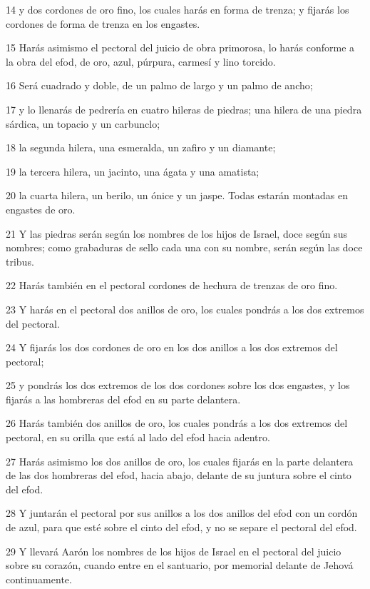 \par 14 y dos cordones de oro fino, los cuales harás en forma de trenza; y fijarás los cordones de forma de trenza en los engastes.
\par 15 Harás asimismo el pectoral del juicio de obra primorosa, lo harás conforme a la obra del efod, de oro, azul, púrpura, carmesí y lino torcido.
\par 16 Será cuadrado y doble, de un palmo   de largo y un palmo de ancho;
\par 17 y lo llenarás de pedrería en cuatro hileras de piedras; una hilera de una piedra sárdica, un topacio y un carbunclo;
\par 18 la segunda hilera, una esmeralda, un zafiro y un diamante;
\par 19 la tercera hilera, un jacinto, una ágata y una amatista;
\par 20 la cuarta hilera, un berilo, un ónice y un jaspe. Todas estarán montadas en engastes de oro.
\par 21 Y las piedras serán según los nombres de los hijos de Israel, doce según sus nombres; como grabaduras de sello cada una con su nombre, serán según las doce tribus.
\par 22 Harás también en el pectoral cordones de hechura de trenzas de oro fino.
\par 23 Y harás en el pectoral dos anillos de oro, los cuales pondrás a los dos extremos del pectoral.
\par 24 Y fijarás los dos cordones de oro en los dos anillos a los dos extremos del pectoral;
\par 25 y pondrás los dos extremos de los dos cordones sobre los dos engastes, y los fijarás a las hombreras del efod en su parte delantera.
\par 26 Harás también dos anillos de oro, los cuales pondrás a los dos extremos del pectoral, en su orilla que está al lado del efod hacia adentro.
\par 27 Harás asimismo los dos anillos de oro, los cuales fijarás en la parte delantera de las dos hombreras del efod, hacia abajo, delante de su juntura sobre el cinto del efod.
\par 28 Y juntarán el pectoral por sus anillos a los dos anillos del efod con un cordón de azul, para que esté sobre el cinto del efod, y no se separe el pectoral del efod.
\par 29 Y llevará Aarón los nombres de los hijos de Israel en el pectoral del juicio sobre su corazón, cuando entre en el santuario, por memorial delante de Jehová continuamente.
